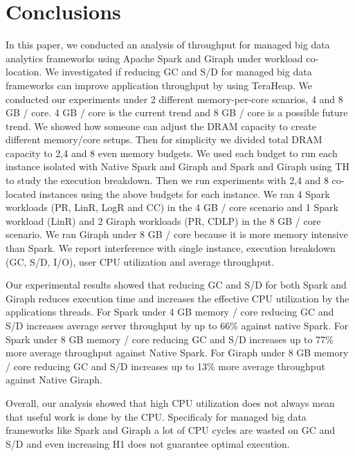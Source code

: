 \section{Conclusions}

In this paper, we conducted an analysis of throughput for managed big data analytics frameworks
using Apache Spark and Giraph under workload co-location. We investigated if reducing GC and S/D for managed big data frameworks can improve application throughput by using TeraHeap. We conducted our experiments under 2 different memory-per-core
scnarios, 4 and 8 GB / core. 4 GB / core is the current trend and 8 GB / core is a possible future trend. 
We showed how someone can adjust the DRAM capacity to create different memory/core setups.
Then for simplicity we divided total DRAM capacity to 2,4 and 8 even memory budgets. We used each budget to run each instance isolated with Native Spark and Giraph and Spark and Giraph using TH to study the execution breakdown.
Then we run experiments with 2,4 and 8 co-located instances using the above budgets for each instance. We ran 4 Spark workloads (PR, LinR, LogR and CC) in the 4 GB / core scenario and 1 Spark workload (LinR) and 2 Giraph workloads (PR, CDLP) in the 8 GB / core scenario. We ran Giraph under 8 GB / core because it is more memory intensive than Spark. We report interference with single instance, execution breakdown (GC, S/D, I/O), user CPU utilization and average throughput.

Our experimental results showed that reducing GC and S/D for both Spark and Giraph reduces execution time and increases the effective CPU utilization by the applications threads. 
For Spark under 4 GB memory / core reducing GC and S/D increases average server throughput by up to 66\% against native Spark.
For Spark under 8 GB memory / core reducing GC and S/D increases up to 77\% more average throughput against Native Spark.
For Giraph under 8 GB memory / core reducing GC and S/D increases up to 13\% more average throughput against Native Giraph. 

Overall, our analysis showed that high CPU utilization does not always mean that useful work is done by the CPU. Specificaly for managed
big data frameworks like Spark and Giraph a lot of CPU cycles are wasted on GC and S/D and even increasing H1 does not guarantee optimal execution.
